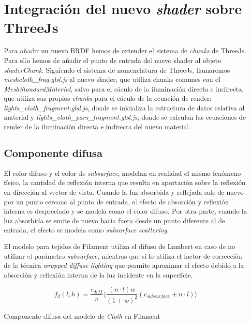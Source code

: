 \vspace{1cm}
\section{Integraci\'on del nuevo \textit{shader} sobre ThreeJs}
  Para a\~nadir un nuevo BRDF hemos de extender el sistema de \textit{chunks} de ThreeJs. Para ello hemos de a\~nadir el
  punto de entrada del nuevo shader al objeto \textit{shaderChunk}. Siguiendo el sistema de nomenclatura de ThreeJs,
  llamaremos \textit{meshcloth\_frag.glsl.js} al nuevo shader, que utiliza chunks comunes con el \textit{MeshStandardMaterial},
  salvo para el c\'aculo de la iluminaci\'on directa e indirecta, que utiliza sus propios \textit{chunks} para el c\'aculo
  de la ecuaci\'on de render: \textit{lights\_cloth\_fragment.glsl.js}, donde se inicializa la estructura de datos relativa
  al material y \textit{lights\_cloth\_pars\_fragment.glsl.js}, donde se calculan las ecuaciones de render de la iluminaci\'on
  directa e indirecta del nuevo material.

  \subsection{Componente difusa}
  El color difuso y el color de \textit{subsurface}, modelan en realidad el mismo fen\'omeno f\'isico, la cantidad de reflexi\'on
  interna que resulta en aportaci\'on sobre la reflexi\'on en direcci\'on al vector de vista. Cuando la luz absorbida y reflejada
  sale de nuevo por un punto cercano al punto de entrada, el efecto de absorci\'on y reflexi\'on interna es despreciado y se modela como el
  color difuso. Por otra parte, cuando la luz absorbida se emite de nuevo hacia fuera desde un punto diferente al de entrada,
  el efecto se modela como \textit{subsurface scattering}.
  
  El modelo para tejidos de Filament utiliza el difuso de Lambert en caso de no utilizar el par\'ametro \textit{subsurface},
  mientras que si lo utiliza el factor de correcci\'on de la t\'ecnica \textit{wrapped diffuse lighting} \autocite{gpugems}
  que permite aproximar el efecto debido a la absorci\'on y reflexi\'on interna de la luz incidente en la superficie.\\

  \begin{eqfloat}[!htb]
    \begin{equation}
      f_d(l, h) = \frac{c_{diff}}{\pi}
      \Bigg\langle
      \frac{(n\cdot{l})w}{(1+ w)^2}( c_{subsurface} + n \cdot{l} )
      \Bigg\rangle
    \end{equation}
  \caption{Componente difusa del modelo de \textit{Cloth} en Filament}
  \end{eqfloat}

